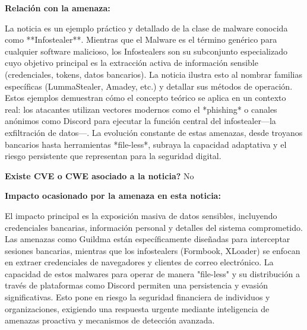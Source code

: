 \begin{tcolorbox}
    \textbf{Relación con la amenaza:}
    \vspace{0.5em}

    La noticia es un ejemplo práctico y detallado de la clase de malware conocida como **Infostealer**. Mientras que el Malware es el término genérico para cualquier software malicioso, los Infostealers son su subconjunto especializado cuyo objetivo principal es la extracción activa de información sensible (credenciales, tokens, datos bancarios). La noticia ilustra esto al nombrar familias específicas (LummaStealer, Amadey, etc.) y detallar sus métodos de operación. Estos ejemplos demuestran cómo el concepto teórico se aplica en un contexto real: los atacantes utilizan vectores modernos como el *phishing* o canales anónimos como Discord para ejecutar la función central del infostealer—la exfiltración de datos—. La evolución constante de estas amenazas, desde troyanos bancarios hasta herramientas *file-less*, subraya la capacidad adaptativa y el riesgo persistente que representan para la seguridad digital.

    \textbf{\textquestiondown Existe CVE o CWE asociado a la noticia?}
    No
    \vspace{0.5em}

    \textbf{Impacto ocasionado por la amenaza en esta noticia:}
    \vspace{0.5em}

    El impacto principal es la exposición masiva de datos sensibles, incluyendo credenciales bancarias, información personal y detalles del sistema comprometido. Las amenazas como Guildma están específicamente diseñadas para interceptar sesiones bancarias, mientras que los infostealers (Formbook, XLoader) se enfocan en extraer credenciales de navegadores y clientes de correo electrónico. La capacidad de estos malwares para operar de manera "file-less" y su distribución a través de plataformas como Discord permiten una persistencia y evasión significativas. Esto pone en riesgo la seguridad financiera de individuos y organizaciones, exigiendo una respuesta urgente mediante inteligencia de amenazas proactiva y mecanismos de detección avanzada.


\end{tcolorbox}